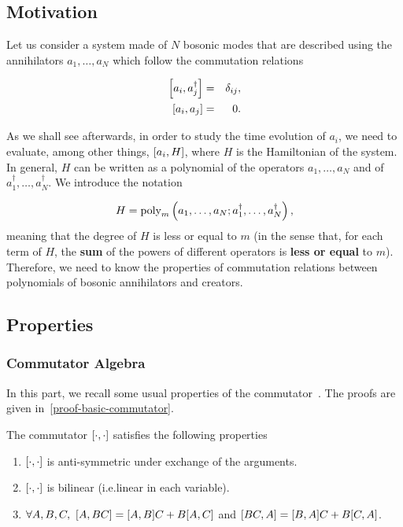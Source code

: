 \subsection{Motivation}
Let us consider a system made of $N$ bosonic modes that are described using the annihilators $a_1, \ldots, a_N$ which follow the commutation relations

\begin{eqnarray}
    \commutator{a_i}{a^\dagger_j} &=& \delta_{i j},\\
    \commutator{a_i}{a_j} &=& 0.
\end{eqnarray}

As we shall see afterwards, in order to study the time evolution of $a_i$, we need to evaluate, among other things, $\commutator{a_i}{H}$, where $H$ is the Hamiltonian of the system. In general, $H$ can be written as a polynomial of the operators $a_1, \ldots, a_N$ and of $a^\dagger_1, \ldots, a^\dagger_N$. We introduce the notation

\begin{equation}
    H = \text{poly}_{m}\left(a_1, \ldots, a_N; a^\dagger_1, \ldots, a^\dagger_N\right),
\end{equation}
meaning that the degree of $H$ is less or equal to $m$ (in the sense that, for each term of $H$, the \textbf{sum} of the powers of different operators is \textbf{less or equal} to $m$). Therefore, we need to know the properties of commutation relations between polynomials of bosonic annihilators and creators.


\subsection{Properties}

\subsubsection{Commutator Algebra}

In this part, we recall some usual properties of the commutator~\cite{commuator_wiki}. The proofs are given in~\autoref{proof-basic-commutator}.

\begin{theorem} \label{basic_commutator}
    The commutator $\commutator{\cdot}{\cdot}$ satisfies the following properties
    \begin{enumerate}
        \item $\commutator{\cdot}{\cdot}$ is anti-symmetric under exchange of the arguments.
        \item $\commutator{\cdot}{\cdot}$ is bilinear (i.e.\@ linear in each variable).
        \item $\forall A, B, C,\  \commutator{A}{B C} = \commutator{A}{B} C + B \commutator{A}{C}$ and $\commutator{B C}{A} = \commutator{B}{A} C + B \commutator{C}{A}$.
    \end{enumerate}
\end{theorem}

